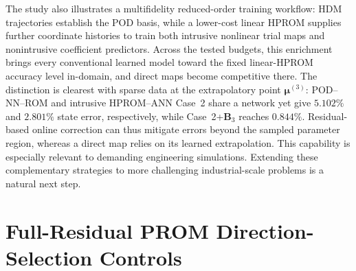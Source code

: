 \documentclass[11pt]{article}
\newcommand{\mub}{\bm\mu}
\begin{document}
The study also illustrates a multifidelity reduced-order training workflow:
HDM trajectories establish the POD basis, while a lower-cost linear HPROM
supplies further coordinate histories to train both intrusive nonlinear
trial maps and nonintrusive coefficient predictors.  Across the tested
budgets, this enrichment brings every conventional learned model toward
the fixed linear-HPROM accuracy level in-domain, and direct maps become
competitive there.  The distinction is clearest with sparse data at the
extrapolatory point $\mub^{(3)}$: POD--NN--ROM and intrusive HPROM--ANN
Case~2 share a network yet give $5.102\%$ and $2.801\%$ state error,
respectively, while Case~2+$\mathbf B_3$ reaches $0.844\%$.  Residual-based
online correction can thus mitigate errors beyond the sampled parameter
region, whereas a direct map relies on its learned extrapolation.  This
capability is especially relevant to demanding engineering simulations.
Extending these complementary strategies to more challenging
industrial-scale problems is a natural next step.

\appendix
\section{Full-Residual PROM Direction-Selection Controls}
\label{sec:adaptive-results}
\end{document}
